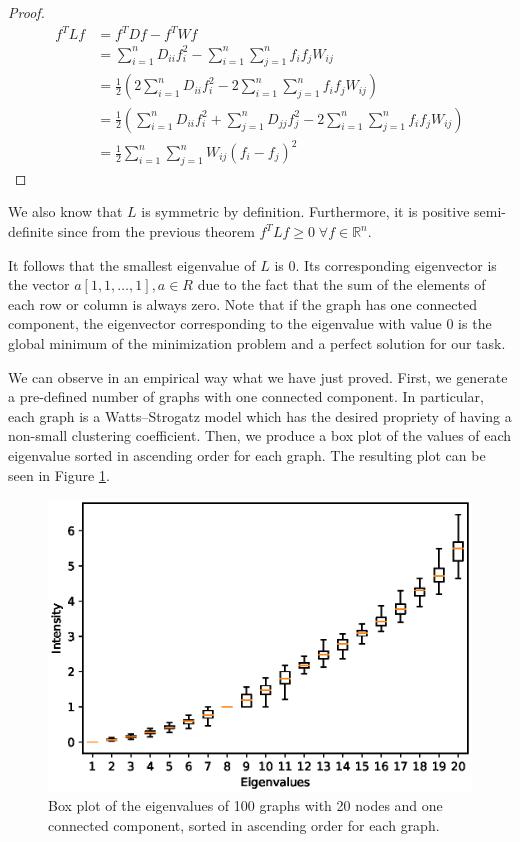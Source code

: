 \documentclass{article}
\begin{document}
\begin{proof}
    \begin{align*}
        f^T L f & = f^T D f - f^T W f                                                                                                 \\
                & = \sum_{i=1}^n D_{ii} f_i^2 - \sum_{i=1}^n \sum_{j=1}^n f_i f_j W_{ij}                                              \\
                & = \frac{1}{2} ( 2 \sum_{i=1}^n D_{ii} f_i^2 - 2 \sum_{i=1}^n \sum_{j=1}^n f_i f_j W_{ij})                           \\
                & = \frac{1}{2} ( \sum_{i=1}^n D_{ii} f_i^2 + \sum_{j=1}^n D_{jj} f_j^2 - 2 \sum_{i=1}^n \sum_{j=1}^n f_i f_j W_{ij}) \\
                & = \frac{1}{2} \sum_{i=1}^n \sum_{j=1}^n W_{ij} (f_i - f_j)^2 \tag*{\qedhere}
    \end{align*}
\end{proof}

We also know that $L$ is symmetric by definition. Furthermore, it is positive semi-definite since from the previous theorem
$f^T L f \geq 0 \; \forall f \in \mathbb{R}^n$.

It follows that the smallest eigenvalue of $L$ is 0. Its corresponding eigenvector is the vector $a [1, 1, \dots, 1], a \in \mathit{R}$
due to the fact that the sum of the elements of each row or column is always zero.
Note that if the graph has one connected component, the eigenvector corresponding to the eigenvalue with value 0 is the global minimum of the
minimization problem and a perfect solution for our task.

We can observe in an empirical way what we have just proved.
First, we generate a pre-defined number of graphs with one connected component.
In particular, each graph is a Watts–Strogatz model \cite{wc} which has the desired propriety of having a non-small clustering coefficient.
Then, we produce a box plot of the values of each eigenvalue sorted in ascending order for each graph.
The resulting plot can be seen in Figure \ref{figure:oneeigen}.

\begin{figure}[ht]
    \centering
    \includegraphics[width=0.5\linewidth]{figures/eigen-one-component.eps}
    \caption{Box plot of the eigenvalues of 100 graphs with 20 nodes and one connected component, sorted in ascending order for each graph.}
    \label{figure:oneeigen}
\end{figure}
\end{document}
